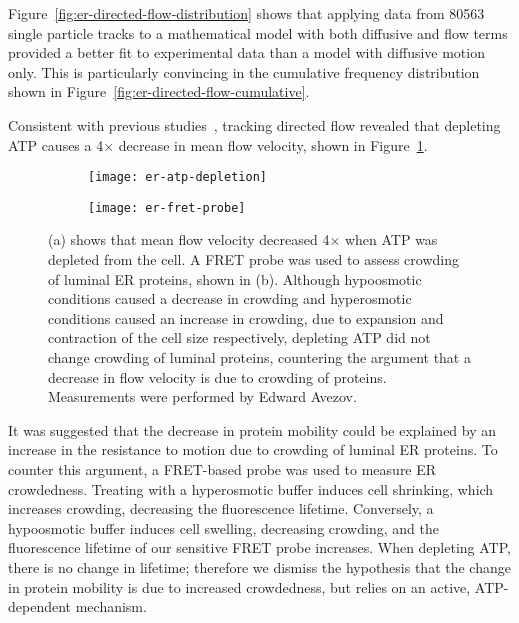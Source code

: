 Figure~\ref{fig:er-directed-flow-distribution} shows that applying data from \num{80563} single particle tracks to a mathematical model with both diffusive and flow terms provided a better fit to experimental data than a model with diffusive motion only. 
This is particularly convincing in the cumulative frequency distribution shown in Figure~\ref{fig:er-directed-flow-cumulative}. 

Consistent with previous studies~\cite{nehls2000dynamics}, tracking directed flow revealed that depleting ATP causes a 4$\times$ decrease in mean flow velocity, shown in Figure~\ref{fig:er-atp-depletion}. 

\begin{figure}[p]
	\centering
	\begin{subfigure}[b]{0.3\textwidth}
		\texttt{[image: er-atp-depletion]}
		\caption{} \label{fig:er-atp-depletion}
	\end{subfigure}	
	\hspace{0.15\textwidth}
	\begin{subfigure}[b]{0.3\textwidth}
		\texttt{[image: er-fret-probe]}
		\caption{} \label{fig:er-fret-probe}
	\end{subfigure}	
	\caption[ER: Flow velocity is reduced upon ATP depletion; a FRET probe reveals this is not due to increased crowding]{(a) shows that mean flow velocity decreased 4$\times$ when ATP was depleted from the cell. A FRET probe was used to assess crowding of luminal ER proteins, shown in (b). Although hypoosmotic conditions caused a decrease in crowding and hyperosmotic conditions caused an increase in crowding, due to expansion and contraction of the cell size respectively, depleting ATP did not change crowding of luminal proteins, countering the argument that a decrease in flow velocity is due to crowding of proteins. Measurements were performed by Edward Avezov. } 
	\label{fig:er-atp}
\end{figure}

It was suggested that the decrease in protein mobility could be explained by an increase in the resistance to motion due to crowding of luminal ER proteins.
To counter this argument, a FRET-based probe was used to measure ER crowdedness.
Treating with a hyperosmotic buffer induces cell shrinking, which increases crowding, decreasing the fluorescence lifetime.
Conversely, a hypoosmotic buffer induces cell swelling, decreasing crowding, and the fluorescence lifetime of our sensitive FRET probe increases.
When depleting ATP, there is no change in lifetime;
therefore we dismiss the hypothesis that the change in protein mobility is due to increased crowdedness, but relies on an active, ATP-dependent mechanism.

